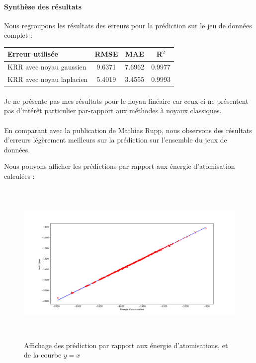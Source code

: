 \documentclass[a4paper,12pt,titlepage]{report}
\begin{document}
\paragraph{Synthèse des résultats}
Nous regroupons les résultats des erreurs pour la prédiction sur le jeu de données complet : \\
\begin{center}
\begin{tabular}{ l| c c c }

   Erreur utilisée  & RMSE & MAE & R$^2$ \\
   \hline
   KRR avec noyau gaussien & 9.6371 & 7.6962 & 0.9977\\
   KRR avec noyau laplacien  & 5.4019 & 3.4555 & 0.9993\\
  \end{tabular}
  \end{center}
\paragraph{}
Je ne présente pas mes résultats pour le noyau linéaire car ceux-ci ne présentent pas d'intérêt particulier par-rapport aux méthodes à noyaux classiques.

\paragraph{}
En comparant avec la publication de Mathias Rupp, nous observons des résultats d'erreurs légèrement meilleurs sur la prédiction sur l'ensemble du jeux de données. 
  
Nous pouvons afficher les prédictions par rapport aux énergie d'atomisation calculées : 

\begin{figure}[!h]	
		\begin{center}
		\includegraphics[height = 8cm, keepaspectratio]{graphes/affichage_prediction.png}
	\caption{Affichage des prédiction par rapport aux énergie d'atomisations, et de la courbe $y = x$}
		\end{center}
	\end{figure}
	
\end{document}
